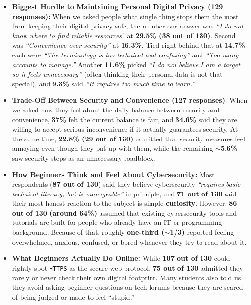 \documentclass[11pt,a4paper]{article}
\begin{document}
\begin{itemize}
    \item \textbf{Biggest Hurdle to Maintaining Personal Digital Privacy (129 responses):} When we asked people what single thing stops them the most from keeping their digital privacy safe, the number one answer was \textit{``I do not know where to find reliable resources''} at \textbf{29.5\% (38 out of 130)}. Second was \textit{``Convenience over security''} at \textbf{16.3\%}. Tied right behind that at \textbf{14.7\%} each were \textit{``The terminology is too technical and confusing''} and \textit{``Too many accounts to manage.''} Another \textbf{11.6\%} picked \textit{``I do not believe I am a target so it feels unnecessary''} (often thinking their personal data is not that special), and \textbf{9.3\%} said \textit{``It requires too much time to learn.''}
    \item \textbf{Trade-Off Between Security and Convenience (127 responses):} When we asked how they feel about the daily balance between security and convenience, \textbf{37\%} felt the current balance is fair, and \textbf{34.6\%} said they are willing to accept serious inconvenience if it actually guarantees security. At the same time, \textbf{22.8\% (29 out of 130)} admitted that security measures feel annoying even though they put up with them, while the remaining \textbf{$\sim$5.6\%} saw security steps as an unnecessary roadblock.
    \item \textbf{How Beginners Think and Feel About Cybersecurity:} Most respondents (\textbf{87 out of 130}) said they believe cybersecurity \textit{``requires basic technical literacy, but is manageable''} in principle, and \textbf{71 out of 130} said their most honest reaction to the subject is simple \textbf{curiosity}. However, \textbf{86 out of 130 (around 64\%)} assumed that existing cybersecurity tools and tutorials are built for people who already have an IT or programming background. Because of that, roughly \textbf{one-third ($\sim$1/3)} reported feeling overwhelmed, anxious, confused, or bored whenever they try to read about it.
    \item \textbf{What Beginners Actually Do Online:} While \textbf{107 out of 130} could rightly spot \texttt{HTTPS} as the secure web protocol, \textbf{75 out of 130} admitted they rarely or never check their own digital footprint. Many students also told us they avoid asking beginner questions on tech forums because they are scared of being judged or made to feel ``stupid.''
\end{itemize}
\end{document}
